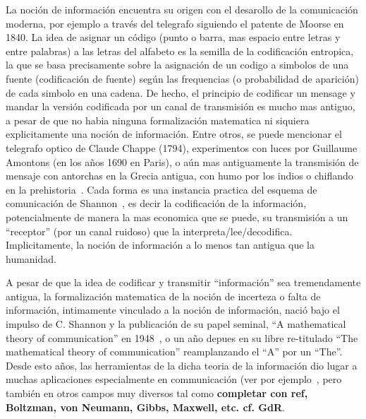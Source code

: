 La  noci\'on  de  informaci\'on encuentra  su  origen  con  el desarollo  de  la
comunicaci\'on  moderna,  por ejemplo  a  trav\'es  del  telegrafo siguiendo  el
patente de Moorse  en 1840. La idea  de asignar un c\'odigo (punto  o barra, mas
espacio entre letras  y entre palabras) a las letras del  alfabeto es la semilla
de  la  codificaci\'on   entropica,  la  que  se  basa   precisamente  sobre  la
asignaci\'on de  un codigo a simbolos  de una fuente  (codificaci\'on de fuente)
seg\'un las frequencias  (o probabilidad de aparici\'on) de  cada simbolo en una
cadena.  De  hecho, el principio de  codificar un mensage y  mandar la versi\'on
codificada por un canal de transmisi\'on es mucho mas antiguo, a pesar de que no
habia ninguna formalizaci\'on matematica ni siquiera explicitamente una noci\'on
de informaci\'on.  Entre otros, se puede mencionar el telegrafo optico de Claude
Chappe (1794), experimentos con luces por Guillaume Amontons (en los a\~nos 1690
en Paris), o a\'un mas antiguamente la transmisi\'on de mensaje con antorchas en
la   Grecia   antigua,   con  humo   por   los   indios   o  chiflando   en   la
prehistoria~\cite{Mon08}.  Cada  forma es una instancia practica  del esquema de
comunicaci\'on de Shannon~\cite{Sha48, ShaWea64},  es decir la codificaci\'on de
la informaci\'on,  potencialmente de  manera la mas  economica que se  puede, su
transmisi\'on   a   un   ``receptor''    (por   un   canal   ruidoso)   que   la
interpreta/lee/decodifica.   Implicitamente, la noci\'on  de informaci\'on  a lo
menos tan antigua que la humanidad.

A  pesar  de  que  la  idea  de codificar  y  transmitir  ``informaci\'on''  sea
tremendamente antigua, la formalizaci\'on matematica de la noci\'on de incerteza
o falta de informaci\'on, intimamente  vinculado a la noci\'on de informaci\'on,
naci\'o bajo el  impulso de C.  Shannon y la publicaci\'on  de su papel seminal,
``A  mathematical theory  of communication''  en 1948~\cite{Sha48},  o  un a\~no
depues  en su  libre re-titulado  ``The mathematical  theory  of communication''
reamplanzando el ``A'' por un ``The''. Desde esto a\~nos, las herramientas de la
dicha teoria de  la informaci\'on dio lugar a  muchas aplicaciones especialmente
en communicaci\'on (ver por  ejemplo~\cite[y ref.]{CovTho06, Ver98, Gal01}, pero
tambi\'en en  otros campos muy  diversos tal como {\color{red}\bf  completar con
  ref, Boltzman, von Neumann, Gibbs, Maxwell, etc. cf. GdR}.

